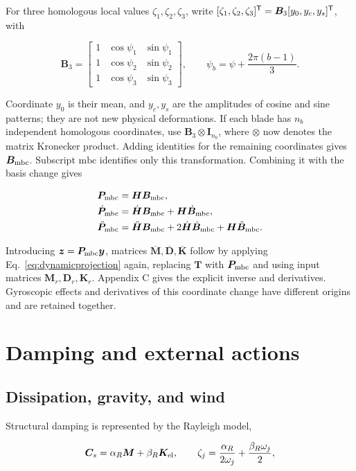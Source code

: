 For three homologous local values $\zeta_1,\zeta_2,\zeta_3$, write $[\zeta_1,\zeta_2,\zeta_3]^\mathsf T=\bm B_3[y_0,y_c,y_s]^\mathsf T$, with

\begin{equation}
\bm B_3=\begin{bmatrix}
1&\cos\psi_1&\sin\psi_1\\
1&\cos\psi_2&\sin\psi_2\\
1&\cos\psi_3&\sin\psi_3
\end{bmatrix},\qquad
\psi_b=\psi+\frac{2\pi(b-1)}3.
\end{equation}

Coordinate $y_0$ is their mean, and $y_c,y_s$ are the amplitudes of cosine and sine patterns; they are not new physical deformations. If each blade has $n_b$ independent homologous coordinates, use $\bm B_3\otimes\bm I_{n_b}$, where $\otimes$ now denotes the matrix Kronecker product. Adding identities for the remaining coordinates gives $\bm B_{\rm mbc}$. Subscript $\mathrm{mbc}$ identifies only this transformation. Combining it with the basis change gives

\begin{align}
\bm P_{\rm mbc}&=\bm H\bm B_{\rm mbc},\nonumber\\
\dot{\bm P}_{\rm mbc}&=\dot{\bm H}\bm B_{\rm mbc}+\bm H\dot{\bm B}_{\rm mbc},\nonumber\\
\ddot{\bm P}_{\rm mbc}&=\ddot{\bm H}\bm B_{\rm mbc}
+2\dot{\bm H}\dot{\bm B}_{\rm mbc}+\bm H\ddot{\bm B}_{\rm mbc}.
\end{align}

Introducing $\bm z=\bm P_{\rm mbc}\bm y$, matrices $\overline{\bm M},\overline{\bm D},\overline{\bm K}$ follow by applying Eq.~\eqref{eq:dynamicprojection} again, replacing $\bm T$ with $\bm P_{\rm mbc}$ and using input matrices $\bm M_r,\bm D_r,\bm K_r$. Appendix C gives the explicit inverse and derivatives. Gyroscopic effects and derivatives of this coordinate change have different origins and are retained together.

\FloatBarrier
\section{Damping and external actions}
\subsection{Dissipation, gravity, and wind}
Structural damping is represented by the Rayleigh model,

\begin{equation}
\bm C_s=\alpha_R\bm M+\beta_R\bm K_{\rm el},\qquad
\zeta_j=\frac{\alpha_R}{2\omega_j}+\frac{\beta_R\omega_j}{2},
\end{equation}

